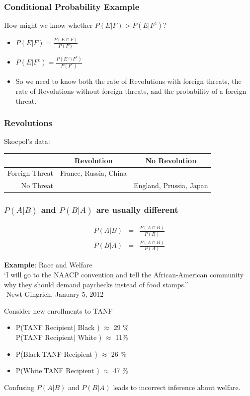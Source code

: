 \documentclass[handout]{beamer}
\numberwithin{equation}{section}
\begin{document}
\begin{frame}
\frametitle{Conditional Probability Example}
How might we know whether $P(E|F)>P(E|F^c)?$\pause
\begin{itemize}
\item $P(E|F)=\frac{P(E\cap F)}{P(F)}$
\item $P(E|F^c)=\frac{P(E\cap F^c)}{P(F^c)}$
\item So we need to know both the rate of Revolutions with foreign threats, the rate of Revolutions without foreign threats, and the probability of a foreign threat.
\end{itemize}

\end{frame}

\begin{frame}
\frametitle{Revolutions}
Skocpol's data:\\
\vspace{1 cm}

\begin{tabular}{r|cc}
&Revolution&No Revolution\\
\hline
Foreign Threat& France, Russia, China\\
No Threat&& England, Prussia, Japan\\
\end{tabular}
\end{frame}



\begin{frame}
\frametitle{$P(A|B)$ and $P(B|A)$ are usually different}


\begin{eqnarray}
P(A|B) & = & \frac{P(A\cap B)}{P(B)} \nonumber \\ 
P(B|A) & = & \frac{P(A \cap B) } {P(A)} \nonumber  
\end{eqnarray}


\pause \pause \pause 
\textbf{Example}: Race and Welfare\\ \pause 
`I will go to the NAACP convention and tell the African-American community why they should demand paychecks instead of food stamps.''\\
			\hfill -Newt Gingrich, January 5, 2012 \pause 

\vspace{0.25in}
Consider new enrollments to TANF \pause 
\begin{itemize}
\item[] P(TANF Recipient$|$ Black )  $\approx$ 29 \%\\  \pause 
P(TANF Recipient$|$ White )  $\approx$ 11\% \\  \pause 
\item[] P(Black$|$TANF Recipient ) $\approx$ 26 \% \pause 
\item[] P(White$|$TANF Recipient ) $\approx$ 47 \% \pause 
\end{itemize}

Confusing $P(A|B)$ and $P(B|A)$ leads to incorrect inference about welfare.

\end{frame}
\end{document}

